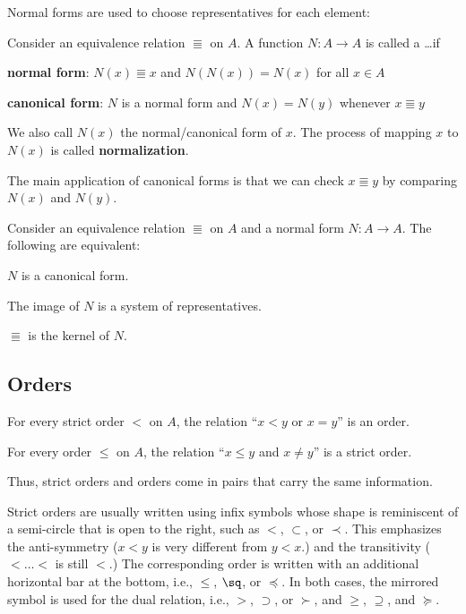 Normal forms are used to choose representatives for each element:

\begin{definition}
Consider an equivalence relation $\Equiv$ on $A$.
A function $N:A\to A$ is called a \ldots if
\begin{compactitem}
 \item \textbf{normal form}: $N(x)\Equiv x$ and $N(N(x))=N(x)$ for all $x\in A$
 \item \textbf{canonical form}: $N$ is a normal form and $N(x)=N(y)$ whenever $x\Equiv y$
\end{compactitem}
\end{definition}

We also call $N(x)$ the normal/canonical form of $x$.
The process of mapping $x$ to $N(x)$ is called \textbf{normalization}.

The main application of canonical forms is that we can check $x\Equiv y$ by comparing $N(x)$ and $N(y)$.

\begin{theorem}\label{thm:math:normalform}
Consider an equivalence relation $\Equiv$ on $A$ and a normal form $N: A\to A$.
The following are equivalent:
\begin{compactitem}
 \item $N$ is a canonical form.
 \item The image of $N$ is a system of representatives.
 \item $\Equiv$ is the kernel of $N$.
\end{compactitem}
\end{theorem}

\subsection{Orders}

\begin{theorem}
For every strict order $<$ on $A$, the relation ``$x<y$ or $x=y$'' is an order.

For every order $\leq$ on $A$, the relation ``$x\leq y$ and $x\neq y$'' is a strict order.
\end{theorem}

Thus, strict orders and orders come in pairs that carry the same information.

Strict orders are usually written using infix symbols whose shape is reminiscent of a semi-circle that is open to the right, such as $<$, $\subset$, or $\prec$.
This emphasizes the anti-symmetry ($x< y$ is very different from $y<x$.) and the transitivity ($< \ldots <$ is still $<$.)
The corresponding order is written with an additional horizontal bar at the bottom, i.e., $\leq$, $\sq$, or $\preceq$.
In both cases, the mirrored symbol is used for the dual relation, i.e., $>$, $\supset$, or $\succ$, and $\geq$, $\supseteq$, and $\succeq$. 

